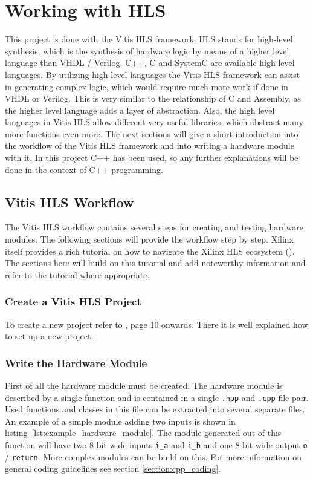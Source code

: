 \section{Working with HLS}
This project is done with the Vitis HLS framework. HLS stands for high-level synthesis, which is the synthesis of hardware logic by means of a higher level language than VHDL / Verilog. C++, C and SystemC are available high level languages.
By utilizing high level languages the Vitis HLS framework can assist in generating complex logic, which would require much more work if done in VHDL or Verilog. This is very similar to the relationship of C and Assembly, as the higher level language adds a layer of abstraction. Also, the high level languages in Vitis HLS allow different very useful libraries, which abstract many more functions even more.
The next sections will give a short introduction into the workflow of the Vitis HLS framework and into writing a hardware module with it.
In this project C++ has been used, so any further explanations will be done in the context of C++ programming.

\subsection{Vitis HLS Workflow}
The Vitis HLS workflow contains several steps for creating and testing hardware modules. The following sections will provide the workflow step by step. Xilinx itself provides a rich tutorial on how to navigate the Xilinx HLS ecosystem (\cite{xilinx:hls_tutorial}). The sections here will build on this tutorial and add noteworthy information and refer to the tutorial where appropriate.

\subsubsection{Create a Vitis HLS Project}
To create a new project refer to \cite{xilinx:hls_tutorial}, page 10 onwards. There it is well explained how to set up a new project.

\subsubsection{Write the Hardware Module}
First of all the hardware module must be created. The hardware module is described by a single function and is contained in a single \texttt{.hpp} and \texttt{.cpp} file pair. Used functions and classes in this file can be extracted into several separate files. An example of a simple module adding two inputs is shown in listing~\ref{lst:example_hardware_module}. The module generated out of this function will have two 8-bit wide inputs \texttt{i\_a} and \texttt{i\_b} and one 8-bit wide output \texttt{o} / \texttt{return}. More complex modules can be build on this. For more information on general coding guidelines see section \ref{section:cpp_coding}.


